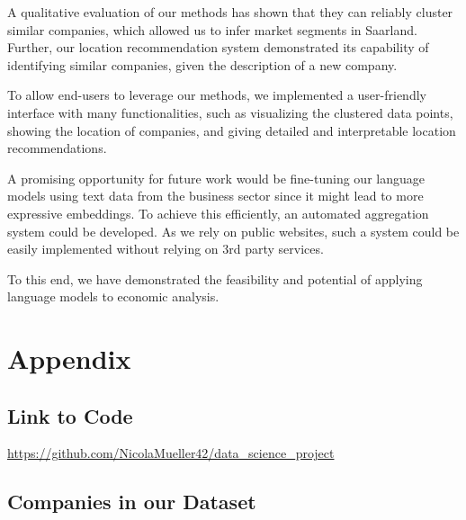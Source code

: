 \documentclass[12pt]{article}
\begin{document}
   A qualitative evaluation of our methods has shown that they can reliably cluster similar companies, which allowed us to infer market segments in Saarland. Further, our location recommendation system demonstrated its capability of identifying similar companies, given the description of a new company.
   
   To allow end-users to leverage our methods, we implemented a user-friendly interface with many functionalities, such as visualizing the clustered data points, showing the location of companies, and giving detailed and interpretable location recommendations.
   
   A promising opportunity for future work would be fine-tuning our language models using text data from the business sector since it might lead to more expressive embeddings. To achieve this efficiently, an automated aggregation system could be developed. As we rely on public websites, such a system could be easily implemented without relying on 3rd party services.
   
   To this end, we have demonstrated the feasibility and potential of applying language models to economic analysis.
    
    
	
	
	\newpage
	\section{Appendix}
	
	\subsection{Link to Code}
	\url{https://github.com/NicolaMueller42/data_science_project}
	
	\subsection{Companies in our Dataset}
	\label{sec:appendix-companies}
	
\end{document}
